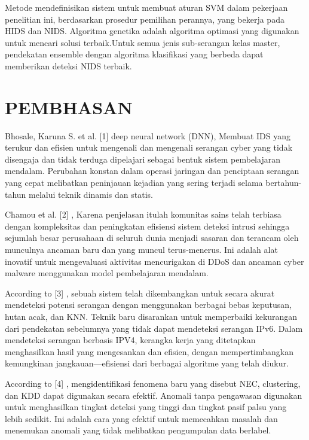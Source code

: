 \documentclass[conference]{IEEEtran}
\begin{document}
Metode mendefinisikan sistem untuk membuat aturan SVM dalam pekerjaan penelitian ini, berdasarkan prosedur pemilihan perannya, yang bekerja pada HIDS dan NIDS. Algoritma genetika adalah algoritma optimasi yang digunakan untuk mencari solusi terbaik.Untuk semua jenis sub-serangan kelas master, pendekatan ensemble dengan algoritma klasifikasi yang berbeda dapat memberikan deteksi NIDS terbaik.

\section{PEMBHASAN}

Bhosale, Karuna S. et al. [1] \cite {bhosale2018modified} deep neural network (DNN), Membuat IDS yang terukur dan efisien untuk mengenali dan mengenali serangan cyber yang tidak disengaja dan tidak terduga dipelajari sebagai bentuk sistem pembelajaran mendalam. Perubahan konstan dalam operasi jaringan dan penciptaan serangan yang cepat melibatkan peninjauan kejadian yang sering terjadi selama bertahun-tahun melalui teknik dinamis dan statis.

Chamou et al. [2] \cite {chamou2019intrusion}, Karena penjelasan itulah komunitas sains telah terbiasa dengan kompleksitas dan peningkatan efisiensi sistem deteksi intrusi sehingga sejumlah besar perusahaan di seluruh dunia menjadi sasaran dan terancam oleh munculnya ancaman baru dan yang muncul terus-menerus. Ini adalah alat inovatif untuk mengevaluasi aktivitas mencurigakan di DDoS dan ancaman cyber malware menggunakan model pembelajaran mendalam.

According to [3] \cite {anbar2016comparative}, sebuah sistem telah dikembangkan untuk secara akurat mendeteksi potensi serangan dengan menggunakan berbagai bebas keputusan, hutan acak, dan KNN. Teknik baru disarankan untuk memperbaiki kekurangan dari pendekatan sebelumnya yang tidak dapat mendeteksi serangan IPv6. Dalam mendeteksi serangan berbasis IPV4, kerangka kerja yang ditetapkan menghasilkan hasil yang mengesankan dan efisien, dengan mempertimbangkan kemungkinan jangkauan—efisiensi dari berbagai algoritme yang telah diukur. 

According to [4] \cite {chen2017novel}, mengidentifikasi fenomena baru yang disebut NEC, clustering, dan KDD dapat digunakan secara efektif. Anomali tanpa pengawasan digunakan untuk menghasilkan tingkat deteksi yang tinggi dan tingkat pasif palsu yang lebih sedikit. Ini adalah cara yang efektif untuk memecahkan masalah dan menemukan anomali yang tidak melibatkan pengumpulan data berlabel.
\end{document}
